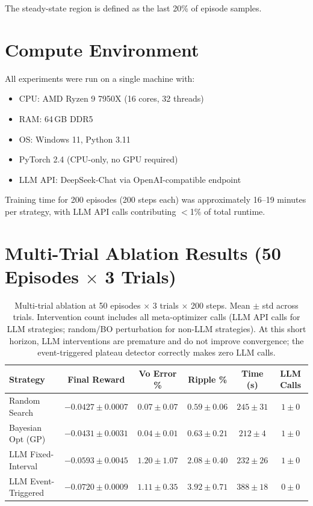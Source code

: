 \documentclass[11pt]{article}
\begin{document}
The steady-state region is defined as the last 20\% of episode samples.

\section{Compute Environment}

All experiments were run on a single machine with:
\begin{itemize}
    \item CPU: AMD Ryzen 9 7950X (16 cores, 32 threads)
    \item RAM: 64\,GB DDR5
    \item OS: Windows 11, Python 3.11
    \item PyTorch 2.4 (CPU-only, no GPU required)
    \item LLM API: DeepSeek-Chat via OpenAI-compatible endpoint
\end{itemize}

Training time for 200 episodes (200 steps each) was approximately 16--19 minutes
per strategy, with LLM API calls contributing $<$1\% of total runtime.

\section{Multi-Trial Ablation Results (50 Episodes $\times$ 3 Trials)}

\begin{table}[h]
\centering
\caption{Multi-trial ablation at 50 episodes $\times$ 3 trials $\times$ 200 steps.
Mean $\pm$ std across trials. Intervention count includes all meta-optimizer calls
(LLM API calls for LLM strategies; random/BO perturbation for non-LLM strategies).
At this short horizon, LLM interventions are premature and do not improve convergence;
the event-triggered plateau detector correctly makes zero LLM calls.}
\label{tab:multitrial}
\begin{tabular}{lccccc}
\toprule
\textbf{Strategy} & \textbf{Final Reward} & \textbf{Vo Error \%} & \textbf{Ripple \%} & \textbf{Time (s)} & \textbf{LLM Calls} \\
\midrule
Random Search      & $-0.0427 \pm 0.0007$ & $0.07 \pm 0.07$ & $0.59 \pm 0.06$ & $245 \pm 31$ & $1 \pm 0$ \\
Bayesian Opt (GP)  & $-0.0431 \pm 0.0031$ & $0.04 \pm 0.01$ & $0.63 \pm 0.21$ & $212 \pm 4$  & $1 \pm 0$ \\
LLM Fixed-Interval & $-0.0593 \pm 0.0045$ & $1.20 \pm 1.07$ & $2.08 \pm 0.40$ & $232 \pm 26$ & $1 \pm 0$ \\
LLM Event-Triggered& $-0.0720 \pm 0.0009$ & $1.11 \pm 0.35$ & $3.92 \pm 0.71$ & $388 \pm 18$ & $0 \pm 0$ \\
\bottomrule
\end{tabular}
\end{table}
\end{document}
